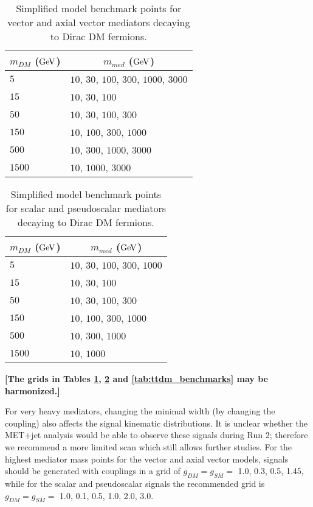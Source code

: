 \documentclass[a4,debug,notitlepage,nobib]{tufte-handout}
\begin{document}
\begin{table}[!ht]
\centering
\begin{tabular}{| l | l |}
\hline
\multicolumn{1}{|c|}{$m_{DM}$ (${\rm GeV}$)} & \multicolumn{1}{c|}{$m_{med}$ (${\rm GeV}$)} \\
\hline
 $5$    & $10$, $30$, $100$, $300$, $1000$, $3000$\\
 $15$   & $10$, $30$, $100$ \\
 $50$   & $10$, $30$, $100$, $300$ \\
 $150$  & $10$, \hspace{12pt} $100$, $300$, $1000$\\
 $500$  & $10$, \hspace{33pt} $300$, $1000$, $3000$  \\
 $1500$  &  $10$,\hspace{57pt} $1000$, $3000$ \\
\hline
\end{tabular}
\caption{Simplified model benchmark points for vector and axial vector mediators
decaying to Dirac DM fermions.}
\label{tab:mMedmDM_VA}
\end{table}

\begin{table}[!ht]
\centering
\begin{tabular}{| l | l |}
\hline
\multicolumn{1}{|c|}{$m_{DM}$ (${\rm GeV}$)} & \multicolumn{1}{c|}{$m_{med}$ (${\rm GeV}$)} \\
\hline
 $5$    & $10$, $30$, $100$, $300$, $1000$\\
 $15$   & $10$, $30$, $100$ \\
 $50$   & $10$, $30$, $100$, $300$ \\
 $150$  & $10$, \hspace{12pt} $100$, $300$, $1000$\\
 $500$  & $10$, \hspace{33pt} $300$, $1000$ \\
 $1500$  &  $10$,\hspace{57pt} $1000$ \\
\hline
\end{tabular}
\caption{Simplified model benchmark points for scalar and pseudoscalar mediators
decaying to Dirac DM fermions.}
\label{tab:mMedmDM_SP}
\end{table}

\textbf{[The grids in Tables \ref{tab:mMedmDM_VA}, \ref{tab:mMedmDM_SP} and 
\ref{tab:ttdm_benchmarks} may be harmonized.]}

For very heavy mediators, changing
the minimal width (by changing the coupling) also affects the signal
kinematic distributions. It is unclear whether the MET+jet analysis
would be able to observe these signals during Run 2; therefore we
recommend a more limited scan which still allows further studies.
For the highest mediator mass points for the vector and axial vector models, 
signals should be generated with couplings in a grid of $g_{DM} = g_{SM} = $ 1.0, 0.3, 0.5, 1.45,
while for the scalar and pseudoscalar signals the recommended grid is
$g_{DM} = g_{SM} = $ 1.0, 0.1, 0.5, 1.0, 2.0, 3.0.
\end{document}
